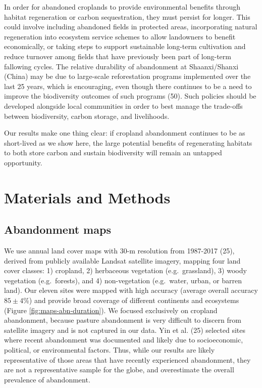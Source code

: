 \documentclass[9pt,twocolumn,twoside,]{pnas-new}
\begin{document}
In order for abandoned croplands to provide environmental benefits through habitat regeneration or carbon sequestration, they must persist for longer.
This could involve including abandoned fields in protected areas, incorporating natural regeneration into ecosystem service schemes to allow landowners to benefit economically, or taking steps to support sustainable long-term cultivation and reduce turnover among fields that have previously been part of long-term fallowing cycles.
The relative durability of abandonment at Shaanxi/Shanxi (China) may be due to large-scale reforestation programs implemented over the last 25 years, which is encouraging, even though there continues to be a need to improve the biodiversity outcomes of such programs (50).
Such policies should be developed alongside local communities in order to best manage the trade-offs between biodiversity, carbon storage, and livelihoods.

Our results make one thing clear: if cropland abandonment continues to be as short-lived as we show here, the large potential benefits of regenerating habitats to both store carbon and sustain biodiversity will remain an untapped opportunity.

\hypertarget{methods}{%
\section{Materials and Methods}\label{methods}}

\hypertarget{abandonment-maps}{%
\subsection{Abandonment maps}\label{abandonment-maps}}

We use annual land cover maps with 30-m resolution from 1987-2017 (25), derived from publicly available Landsat satellite imagery, mapping four land cover classes: 1) cropland, 2) herbaceous vegetation (e.g.~grassland), 3) woody vegetation (e.g.~forests), and 4) non-vegetation (e.g.~water, urban, or barren land).
Our eleven sites were mapped with high accuracy (average overall accuracy \(85\pm4\)\%) and provide broad coverage of different continents and ecosystems (Figure \ref{fig:maps-abn-duration}).
We focused exclusively on cropland abandonment, because pasture abandonment is very difficult to discern from satellite imagery and is not captured in our data.
Yin et al. (25) selected sites where recent abandonment was documented and likely due to socioeconomic, political, or environmental factors.
Thus, while our results are likely representative of those areas that have recently experienced abandonment, they are not a representative sample for the globe, and overestimate the overall prevalence of abandonment.
\end{document}

